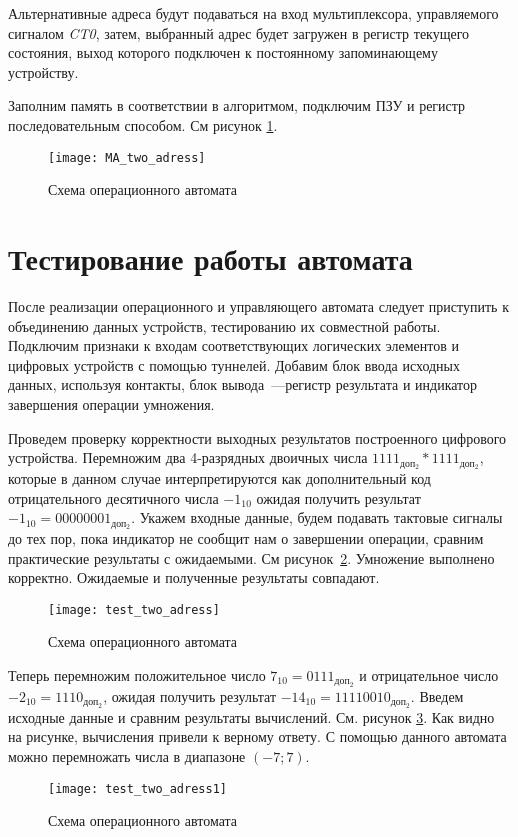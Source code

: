 \documentclass[a4paper,14pt]{extarticle}
\begin{document}
Альтернативные адреса будут подаваться на вход мультиплексора, управляемого сигналом \textit{CT0}, затем, выбранный адрес будет загружен в регистр текущего состояния, выход которого подключен к постоянному запоминающему устройству.


Заполним память в соответствии в алгоритмом, подключим ПЗУ и регистр последовательным способом. См рисунок \ref{img:ma}.
\begin{figure}[htbp]
	\centering
	\texttt{[image: MA\_two\_adress]}
	\caption {Схема операционного автомата}
	\label{img:ma}
\end{figure}

\section{Тестирование работы автомата}
После реализации операционного и управляющего автомата следует приступить к объединению данных устройств, тестированию их совместной работы. Подключим признаки к входам соответствующих логических элементов и цифровых устройств с помощью туннелей. Добавим блок ввода исходных данных, используя контакты, блок вывода~---регистр результата и индикатор завершения операции умножения.

Проведем проверку корректности выходных результатов построенного цифрового устройства. Перемножим два  4-разрядных двоичных числа $1111_{доп_2} \ast 1111_{доп_2}$, которые в данном случае интерпретируются как дополнительный код отрицательного десятичного числа $-1_{10}$ ожидая получить результат $-1_{10} = 00000001_{доп_2}$. Укажем входные данные, будем подавать тактовые сигналы до тех пор, пока индикатор не сообщит нам о завершении операции, сравним практические результаты с ожидаемыми. См рисунок~\ref{img:test}. Умножение выполнено корректно. Ожидаемые и полученные результаты совпадают.
\begin{figure}[h!]
	\centering
	\texttt{[image: test\_two\_adress]}
	\caption {Схема операционного автомата}
	\label{img:test}
\end{figure}

Теперь перемножим положительное число $7_{10}=0111_{доп_2}$ и отрицательное число $-2_{10}=1110_{доп_2}$, ожидая получить результат $-14_{10}=11110010_{доп_2}$. Введем исходные данные и сравним результаты вычислений. См. рисунок \ref{img:test1}. Как видно на рисунке, вычисления привели к верному ответу. С помощью данного автомата можно перемножать числа в диапазоне $(-7;7)$.
\begin{figure}[h!]
	\centering
	\texttt{[image: test\_two\_adress1]}
	\caption {Схема операционного автомата}
	\label{img:test1}
\end{figure}
\newpage
\end{document}
